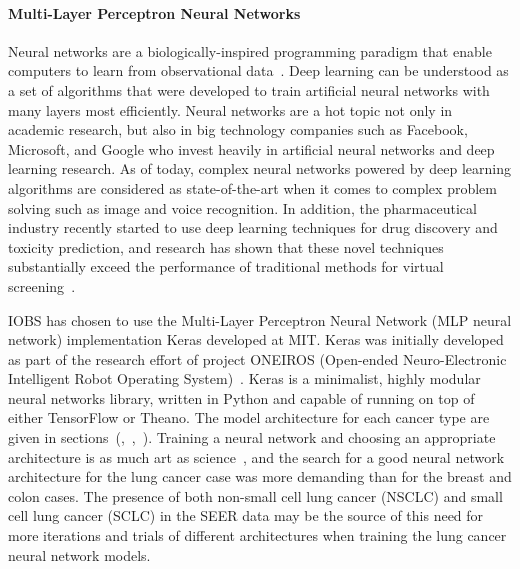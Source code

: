 \documentclass[10pt,letterpaper]{article}
\begin{document}
\paragraph{Multi-Layer Perceptron Neural Networks}
Neural networks are a biologically-inspired programming paradigm that enable computers to learn from observational data~\cite{deeplearning}.
Deep learning can be understood as a set of algorithms that were developed to train artificial neural networks with many layers most efficiently.
 Neural networks are a hot topic not only in academic research, but also in big technology companies such as Facebook, Microsoft, and Google who invest heavily in artificial neural networks and deep learning research. As of today, complex neural networks powered by deep learning algorithms are considered as state-of-the-art when it comes to complex problem solving such as image and voice recognition.
In addition, the pharmaceutical industry recently started to use deep learning techniques for drug discovery and toxicity prediction, and research has shown that these novel techniques substantially exceed the performance of traditional methods for virtual screening~\cite{toxicity}.

IOBS has chosen to use the Multi-Layer Perceptron Neural Network (MLP neural network) implementation Keras developed at MIT.
Keras was initially developed as part of the research effort of project ONEIROS (Open-ended Neuro-Electronic Intelligent Robot Operating System)~\cite{keras}.
Keras is a minimalist, highly modular neural networks library, written in Python and capable of running on top of either TensorFlow or Theano. The model architecture for each cancer type are given in sections~(,~,~). Training a neural network and choosing an appropriate architecture is as much art as science~\cite{deeplearning}, and the search for a good neural network architecture for the lung cancer case was more demanding than for the breast and colon cases. The presence of both non-small cell lung cancer (NSCLC) and small cell lung cancer (SCLC) in the SEER data may be the source of this need for more iterations and trials of different architectures when training the lung cancer neural network models.




\end{document}
